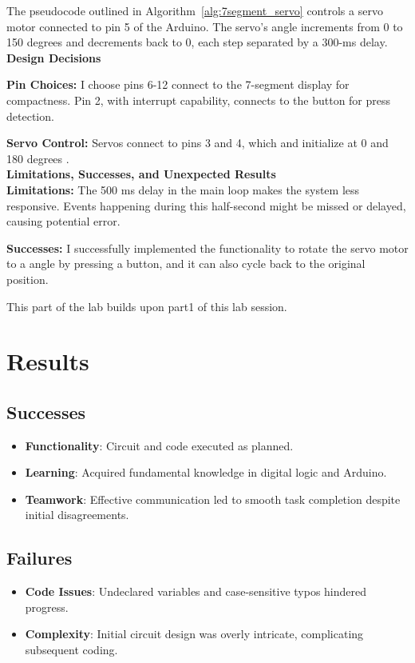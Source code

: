 \documentclass[journal]{IEEEtran}
\begin{document}
The pseudocode outlined in Algorithm~\ref{alg:7segment_servo} controls a servo motor connected to pin 5 of the Arduino. The servo's angle increments from 0 to 150 degrees and decrements back to 0, each step separated by a 300-ms delay.\\

\textbf{Design Decisions}

\textbf{Pin Choices:} 
I choose pins 6-12 connect to the 7-segment display for compactness. Pin 2, with interrupt capability, connects to the button for press detection. 

\textbf{Servo Control:} 
Servos connect to pins 3 and 4, which and initialize at 0 and 180 degrees .\\

\textbf{Limitations, Successes, and Unexpected Results}\\
\textbf{Limitations:}
The 500 ms delay in the main loop makes the system less responsive. Events happening during this half-second might be missed or delayed, causing potential error.

\textbf{Successes:}
I successfully implemented the functionality to rotate the servo motor to a angle by pressing a button, and it can also cycle back to the original position.

This part of the lab builds upon part1 of this lab session\cite{elec1601_notes}.

\section{Results}
\subsection{Successes}
\begin{itemize}
    \item \textbf{Functionality}: Circuit and code executed as planned\cite{elec1601_notes}.
    \item \textbf{Learning}: Acquired fundamental knowledge in digital logic and Arduino.
    \item \textbf{Teamwork}: Effective communication led to smooth task completion despite initial disagreements.
\end{itemize}

\subsection{Failures}
\begin{itemize}
    \item \textbf{Code Issues}: Undeclared variables and case-sensitive typos hindered progress.
    \item \textbf{Complexity}: Initial circuit design was overly intricate, complicating subsequent coding.
\end{itemize}
\end{document}

